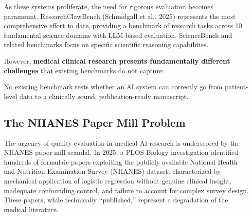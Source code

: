 \documentclass[12pt]{article}
\begin{document}
As these systems proliferate, the need for rigorous evaluation becomes paramount. ResearchClawBench (Schmidgall et al., 2025) represents the most comprehensive effort to date, providing a benchmark of research tasks across 10 fundamental science domains with LLM-based evaluation. ScienceBench and related benchmarks focus on specific scientific reasoning capabilities.

However, \textbf{medical clinical research presents fundamentally different challenges} that existing benchmarks do not capture:

\begin{table}[ht]
\centering
\caption{Challenges distinguishing medical clinical research from fundamental science benchmarks.}
\end{table}

No existing benchmark tests whether an AI system can correctly go from patient-level data to a clinically sound, publication-ready manuscript.

\subsection{The NHANES Paper Mill Problem}

The urgency of quality evaluation in medical AI research is underscored by the NHANES paper mill scandal. In 2025, a PLOS Biology investigation identified hundreds of formulaic papers exploiting the publicly available National Health and Nutrition Examination Survey (NHANES) dataset, characterized by mechanical application of logistic regression without genuine clinical insight, inadequate confounding control, and failure to account for complex survey design. These papers, while technically ``published,'' represent a degradation of the medical literature.
\end{document}
